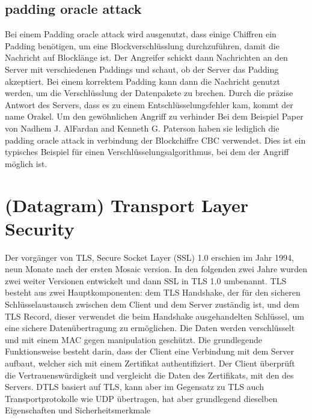 \documentclass[a4paper,10pt]{scrartcl}
\begin{document}
    \subsection{padding oracle attack}\label{subsec:padding-oracle-attack}
    Bei einem Padding oracle attack wird ausgenutzt, dass einige Chiffren ein Padding benötigen, um eine Blockverschlüsslung durchzuführen, damit die Nachricht auf Blocklänge ist.
    Der Angreifer schickt dann Nachrichten an den Server mit verschiedenen Paddings und schaut, ob der Server das Padding akzeptiert.
    Bei einem korrektem Padding kann dann die Nachricht genutzt werden, um die Verschlüsslung der Datenpakete zu brechen.
    Durch die präzise Antwort des Servers, dass es zu einem Entschlüsselungsfehler kam, kommt der name Orakel\cite{Rizzo2010}.
    Um den gewöhnlichen Angriff zu verhinder \newline
    Bei dem Beispiel Paper von Nadhem J. AlFardan and Kenneth G. Paterson haben sie lediglich die padding oracle attack in verbindung der Blockchiffre CBC verwendet.
    Dies ist ein typisches Beispiel für einen Verschlüsselungsalgorithmus, bei dem der Angriff möglich ist.


    \section{(Datagram) Transport Layer Security}\label{sec:(d)tls}
    Der vorgänger von TLS, Secure Socket Layer (SSL) 1.0 erschien im Jahr 1994, neun Monate nach der ersten Mosaic version.
    In den folgenden zwei Jahre wurden zwei weiter Versionen entwickelt und dann SSL in TLS 1.0 umbenannt.
    \newline
    TLS besteht aus zwei Hauptkomponenten: dem TLS Handshake, der für den sicheren Schlüsselaustausch zwischen dem Client und dem Server zuständig ist,
    und dem TLS Record, dieser verwendet die beim Handshake ausgehandelten Schlüssel, um eine sichere Datenübertragung zu ermöglichen.
    Die Daten werden verschlüsselt und mit einem MAC gegen manipulation geschützt.
    Die grundlegende Funktionsweise besteht darin, dass der Client eine Verbindung mit dem Server aufbaut, welcher sich mit einem Zertifikat authentifiziert.
    Der Client überprüft die Vertrauenswürdigkeit und vergleicht die Daten des Zertifikats, mit den des Servers.
    \newline
    DTLS basiert auf TLS, kann aber im Gegensatz zu TLS auch Transportprotokolle wie UDP übertragen, hat aber grundlegend dieselben Eigenschaften und Sicherheitsmerkmale
\end{document}
